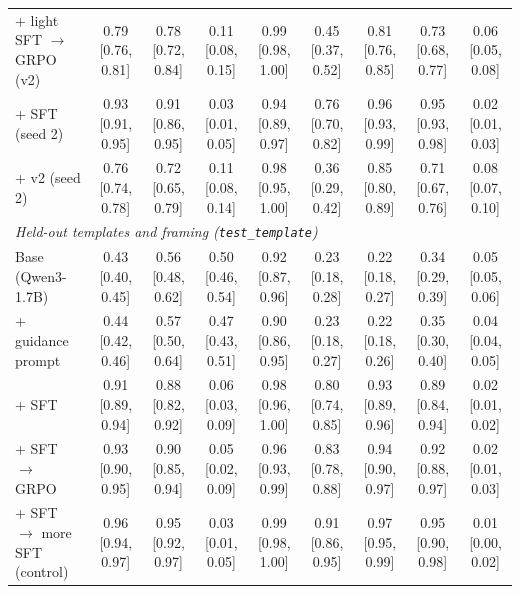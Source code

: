 \begin{tabular}{lcccccccc}
+ light SFT $\to$ GRPO (v2) & 0.79 {\scriptsize [0.76, 0.81]} & 0.78 {\scriptsize [0.72, 0.84]} & 0.11 {\scriptsize [0.08, 0.15]} & 0.99 {\scriptsize [0.98, 1.00]} & 0.45 {\scriptsize [0.37, 0.52]} & 0.81 {\scriptsize [0.76, 0.85]} & 0.73 {\scriptsize [0.68, 0.77]} & 0.06 {\scriptsize [0.05, 0.08]} \\
+ SFT (seed 2) & 0.93 {\scriptsize [0.91, 0.95]} & 0.91 {\scriptsize [0.86, 0.95]} & 0.03 {\scriptsize [0.01, 0.05]} & 0.94 {\scriptsize [0.89, 0.97]} & 0.76 {\scriptsize [0.70, 0.82]} & 0.96 {\scriptsize [0.93, 0.99]} & 0.95 {\scriptsize [0.93, 0.98]} & 0.02 {\scriptsize [0.01, 0.03]} \\
+ v2 (seed 2) & 0.76 {\scriptsize [0.74, 0.78]} & 0.72 {\scriptsize [0.65, 0.79]} & 0.11 {\scriptsize [0.08, 0.14]} & 0.98 {\scriptsize [0.95, 1.00]} & 0.36 {\scriptsize [0.29, 0.42]} & 0.85 {\scriptsize [0.80, 0.89]} & 0.71 {\scriptsize [0.67, 0.76]} & 0.08 {\scriptsize [0.07, 0.10]} \\
\midrule
\multicolumn{9}{l}{\textit{Held-out templates and framing (\texttt{test\_template})}} \\
\midrule
Base (Qwen3-1.7B) & 0.43 {\scriptsize [0.40, 0.45]} & 0.56 {\scriptsize [0.48, 0.62]} & 0.50 {\scriptsize [0.46, 0.54]} & 0.92 {\scriptsize [0.87, 0.96]} & 0.23 {\scriptsize [0.18, 0.28]} & 0.22 {\scriptsize [0.18, 0.27]} & 0.34 {\scriptsize [0.29, 0.39]} & 0.05 {\scriptsize [0.05, 0.06]} \\
+ guidance prompt & 0.44 {\scriptsize [0.42, 0.46]} & 0.57 {\scriptsize [0.50, 0.64]} & 0.47 {\scriptsize [0.43, 0.51]} & 0.90 {\scriptsize [0.86, 0.95]} & 0.23 {\scriptsize [0.18, 0.27]} & 0.22 {\scriptsize [0.18, 0.26]} & 0.35 {\scriptsize [0.30, 0.40]} & 0.04 {\scriptsize [0.04, 0.05]} \\
+ SFT & 0.91 {\scriptsize [0.89, 0.94]} & 0.88 {\scriptsize [0.82, 0.92]} & 0.06 {\scriptsize [0.03, 0.09]} & 0.98 {\scriptsize [0.96, 1.00]} & 0.80 {\scriptsize [0.74, 0.85]} & 0.93 {\scriptsize [0.89, 0.96]} & 0.89 {\scriptsize [0.84, 0.94]} & 0.02 {\scriptsize [0.01, 0.02]} \\
+ SFT $\to$ GRPO & 0.93 {\scriptsize [0.90, 0.95]} & 0.90 {\scriptsize [0.85, 0.94]} & 0.05 {\scriptsize [0.02, 0.09]} & 0.96 {\scriptsize [0.93, 0.99]} & 0.83 {\scriptsize [0.78, 0.88]} & 0.94 {\scriptsize [0.90, 0.97]} & 0.92 {\scriptsize [0.88, 0.97]} & 0.02 {\scriptsize [0.01, 0.03]} \\
+ SFT $\to$ more SFT (control) & 0.96 {\scriptsize [0.94, 0.97]} & 0.95 {\scriptsize [0.92, 0.97]} & 0.03 {\scriptsize [0.01, 0.05]} & 0.99 {\scriptsize [0.98, 1.00]} & 0.91 {\scriptsize [0.86, 0.95]} & 0.97 {\scriptsize [0.95, 0.99]} & 0.95 {\scriptsize [0.90, 0.98]} & 0.01 {\scriptsize [0.00, 0.02]} \\

\end{tabular}
